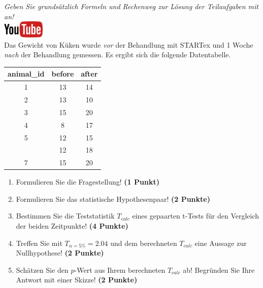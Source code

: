 \documentclass[a4paper, 9pt]{scrartcl}\usepackage[]{graphicx}\usepackage[]{xcolor}
\begin{document}
\textit{Geben Sie grunds{\"a}tzlich Formeln und Rechenweg zur L{\"o}sung der
  Teilaufgaben mit an!} \\[1Ex]

\hfill\href{https://youtu.be/QR90zyn0Iz8}{\includegraphics[width =
  2cm]{img/youtube}}\\[1Ex]


Das Gewicht von K{\"u}ken wurde \textit{vor} der Behandlung mit STARTex und 1
Woche \textit{nach} der Behandlung gemessen. Es ergibt sich die folgende
Datentabelle.

\begin{table}[!h]
\centering
\begin{tabular}{ccc}
\toprule
animal\_id & before & after\\
\midrule
1 & 13 & 14\\
2 & 13 & 10\\
3 & 15 & 20\\
4 & 8 & 17\\
5 & 12 & 15\\
\addlinespace
6 & 12 & 18\\
7 & 15 & 20\\
\bottomrule
\end{tabular}
\end{table}



\begin{enumerate}
\item Formulieren Sie die Fragestellung! \textbf{(1 Punkt)}
\item Formulieren Sie das statistische Hypothesenpaar! \textbf{(2
    Punkte)}
\item Bestimmen Sie die Teststatistik $T_{calc}$ eines gepaarten t-Tests f{\"u}r den
  Vergleich der beiden Zeitpunkte! \textbf{(4 Punkte)}
\item Treffen Sie mit $T_{\alpha = 5\%} = 2.04$ und dem berechneten $T_{calc}$ eine Aussage
  zur Nullhypothese! \textbf{(2 Punkte)}
\item Sch{\"a}tzen Sie den $p$-Wert aus Ihrem berechneten $T_{calc}$ ab!
  Begr{\"u}nden Sie Ihre Antwort mit einer Skizze! \textbf{(2
    Punkte)}
\end{enumerate} 
\clearpage
\end{document}
